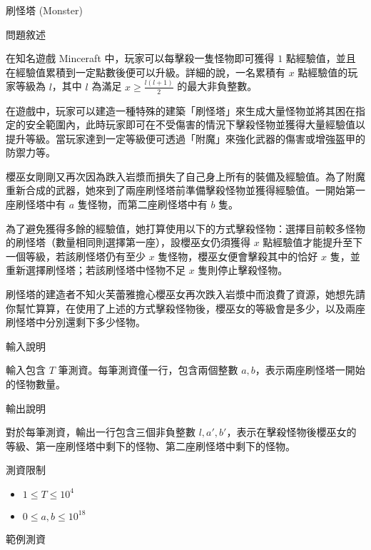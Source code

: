 \documentclass[12pt]{article}
\newcommand{\ProblemTitleFont}{\ProblemTitleMainFont\ProblemTitleCJKFont}
\newcommand{\ProblemTitle}[2]{\noindent\Huge{\ProblemTitleFont #1 (#2)}\normalsize\par}
\newcommand{\ProblemSection}[1]{\vspace{0.6cm}\par\noindent\large{\ProblemTitleFont #1}\normalsize\par}
\newcommand{\ProblemStatement}{\ProblemSection{問題敘述}}
\newcommand{\ProblemInput}{\ProblemSection{輸入說明}}
\newcommand{\ProblemOutput}{\ProblemSection{輸出說明}}
\newcommand{\ProblemConstraints}{\ProblemSection{測資限制}}
\newcommand{\ProblemSampleTitle}{\ProblemSection{範例測資}}
\newcounter{ProblemSample}
\begin{document}
\renewcommand{\headrulewidth}{0pt}
\renewcommand{\baselinestretch}{1.3}
\setlength\parindent{24pt}
\setlength\parskip{12pt}
\cfoot{\thepage}

\ProblemTitle{刷怪塔}{Monster}

\ProblemStatement

在知名遊戲 Minceraft 中，玩家可以每擊殺一隻怪物即可獲得 $1$ 點經驗值，並且在經驗值累積到一定點數後便可以升級。詳細的說，一名累積有 $x$ 點經驗值的玩家等級為 $l$，其中 $l$ 為滿足 $x \ge \frac{l(l+1)}{2}$ 的最大非負整數。

在遊戲中，玩家可以建造一種特殊的建築「刷怪塔」來生成大量怪物並將其困在指定的安全範圍內，此時玩家即可在不受傷害的情況下擊殺怪物並獲得大量經驗值以提升等級。當玩家達到一定等級便可透過「附魔」來強化武器的傷害或增強盔甲的防禦力等。

櫻巫女剛剛又再次因為跌入岩漿而損失了自己身上所有的裝備及經驗值。為了附魔重新合成的武器，她來到了兩座刷怪塔前準備擊殺怪物並獲得經驗值。一開始第一座刷怪塔中有 $a$ 隻怪物，而第二座刷怪塔中有 $b$ 隻。

為了避免獲得多餘的經驗值，她打算使用以下的方式擊殺怪物：選擇目前較多怪物的刷怪塔（數量相同則選擇第一座），設櫻巫女仍須獲得 $x$ 點經驗值才能提升至下一個等級，若該刷怪塔仍有至少 $x$ 隻怪物，櫻巫女便會擊殺其中的恰好 $x$ 隻，並重新選擇刷怪塔；若該刷怪塔中怪物不足 $x$ 隻則停止擊殺怪物。

刷怪塔的建造者不知火芙蕾雅擔心櫻巫女再次跌入岩漿中而浪費了資源，她想先請你幫忙算算，在使用了上述的方式擊殺怪物後，櫻巫女的等級會是多少，以及兩座刷怪塔中分別還剩下多少怪物。

\ProblemInput

輸入包含 $T$ 筆測資。每筆測資僅一行，包含兩個整數 $a,b$，表示兩座刷怪塔一開始的怪物數量。

\ProblemOutput

對於每筆測資，輸出一行包含三個非負整數 $l,a',b'$，表示在擊殺怪物後櫻巫女的等級、第一座刷怪塔中剩下的怪物、第二座刷怪塔中剩下的怪物。

\clearpage

\ProblemConstraints

\begin{itemize}
    \item $1 \le T \le 10^4$
    \item $0 \le a,b \le 10^{18}$
\end{itemize}

\ProblemSampleTitle
\end{document}
